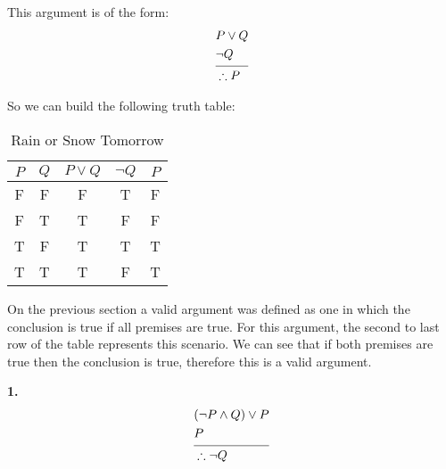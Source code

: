 This argument is of the form: 
\begin{align*}
    &P \lor Q\\
    &\neg Q\\
          \noalign{\vspace{-8pt}}
          \cline{1-2}
          \noalign{\vspace{-4pt}}
    &\therefore P\\
\end{align*}

\newpage

So we can build the following truth table:

\begin{table}[h]
\centering
\label{tab:snow_or_rain }
\begin{tabular}{|c|c|c|c|c|}
  \hline
  $P$ & $Q$ & $P \lor Q$ & $\neg Q$ & $P$\\
  \hline 
  F & F & F & T & F\\ 
  F & T & T & F & F\\  
  T & F & T & T & T\\  
  T & T & T & F & T\\
  \hline
\end{tabular}
\caption{Rain or Snow Tomorrow}
\end{table}

On the previous section a valid argument was defined as one in which the conclusion is true if all premises are true. 
For this argument, the second to last row of the table represents this scenario. 
We can see that if both premises are true then the conclusion is true, therefore this is a valid argument. 


\sol \textbf{1.} 
  \begin{align*}
      &(\neg P \land Q) \lor P\\
      &P\\
            \noalign{\vspace{-8pt}}
            \cline{1-2}
            \noalign{\vspace{-4pt}}
      &\therefore \neg Q\\
  \end{align*}

